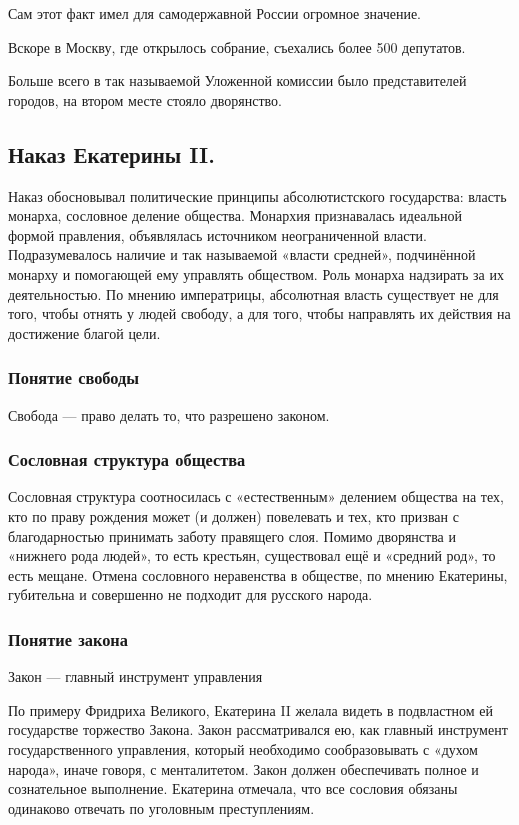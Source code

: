 Сам этот факт имел для самодержавной России огромное значение.

Вскоре в Москву, где открылось собрание, съехались более 500 депутатов. 

Больше всего в так называемой Уложенной комиссии было представителей городов, на втором месте стояло дворянство.

\subsection{Наказ Екатерины II.}

Наказ обосновывал политические принципы абсолютистского государства: власть монарха, сословное деление общества. Монархия признавалась идеальной формой правления, объявлялась источником неограниченной власти. Подразумевалось наличие и так называемой «власти средней», подчинённой монарху и помогающей ему управлять обществом. Роль монарха надзирать за их деятельностью. По мнению императрицы, абсолютная власть существует не для того, чтобы отнять у людей свободу, а для того, чтобы направлять их действия на достижение благой цели.

\subsubsection{Понятие свободы}

Свобода — право делать то, что разрешено законом.

\subsubsection{Сословная структура общества}

Сословная структура соотносилась с «естественным» делением общества на тех, кто по праву рождения может (и должен) повелевать и тех, кто призван с благодарностью принимать заботу правящего слоя. Помимо дворянства и «нижнего рода людей», то есть крестьян, существовал ещё и «средний род», то есть мещане. Отмена сословного неравенства в обществе, по мнению Екатерины, губительна и совершенно не подходит для русского народа.

\subsubsection{Понятие закона}
Закон — главный инструмент управления

По примеру Фридриха Великого, Екатерина II желала видеть в подвластном ей государстве торжество Закона. Закон рассматривался ею, как главный инструмент государственного управления, который необходимо сообразовывать с «духом народа», иначе говоря, с менталитетом. Закон должен обеспечивать полное и сознательное выполнение. Екатерина отмечала, что все сословия обязаны одинаково отвечать по уголовным преступлениям.

